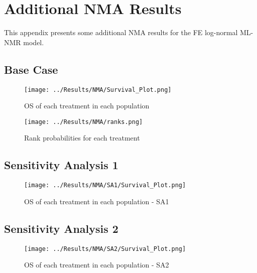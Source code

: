 \chapter{Additional NMA Results}\label{NMAAppendix}

This appendix presents some additional NMA results for the FE log-normal ML-NMR model. 

\section{Base Case}

\begin{figure}[h]
    \centering
    \texttt{[image: ../Results/NMA/Survival\_Plot.png]}
    \caption{OS of each treatment in each population}
    \label{fig:pred_survbc}
\end{figure}

\begin{figure}[h]
    \centering
    \texttt{[image: ../Results/NMA/ranks.png]}
    \caption{Rank probabilities for each treatment}
    \label{fig:rankplot}
\end{figure}

\clearpage
\section{Sensitivity Analysis 1}

\begin{figure}[h]
    \centering
    \texttt{[image: ../Results/NMA/SA1/Survival\_Plot.png]}
    \caption{OS of each treatment in each population - SA1}
    \label{fig:pred_survSA1}
\end{figure}

\clearpage
\section{Sensitivity Analysis 2}

\begin{figure}[h]
    \centering
    \texttt{[image: ../Results/NMA/SA2/Survival\_Plot.png]}
    \caption{OS of each treatment in each population - SA2}
    \label{fig:pred_survSA2}
\end{figure}
